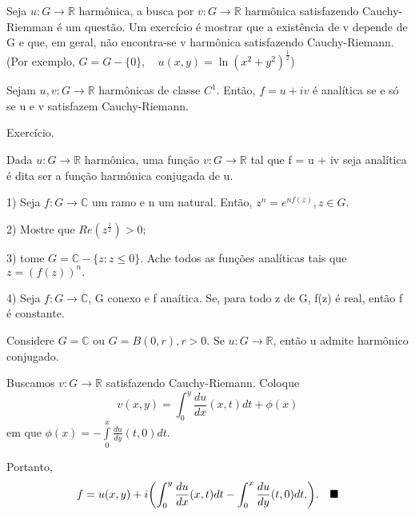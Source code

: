 \documentclass[ComplexAnalysis/complex.tex]{subfiles}
\begin{document}
Seja $u:G\rightarrow \mathbb{R}$ harm\^onica, a busca por $v:G\rightarrow \mathbb{R}$ harm\^onica
satisfazendo Cauchy-Riemman é um questão. Um exercício é mostrar que a existência de v
depende de G e que, em geral, não encontra-se v harm\^onica satisfazendo Cauchy-Riemann.
(Por exemplo, $G = G - \{0\}, \quad u(x, y) = \ln{(x ^{2} + y ^{2})}^{\frac{1}{2}}$)
\begin{theorem*}
	Sejam $u, v:G\rightarrow \mathbb{R}$ harm\^onicas de classe $C^1$. Então, $f = u + iv$
	é analítica se e só se u e v satisfazem Cauchy-Riemann.
\end{theorem*}
\begin{proof*}
	Exercício.
\end{proof*}
Dada $u:G\rightarrow \mathbb{R}$ harm\^onica, uma função $v:G\rightarrow \mathbb{R}$
tal que f = u + iv seja analítica é dita ser a função harm\^onica conjugada de u.
\begin{exer*}
	\item[1)] Seja $f:G\rightarrow \mathbb{C}$  um ramo e n um natural. Então, $z ^{n} = e ^{nf(z)}, z\in{G}.$
	\item[2)] Mostre que $Re(z ^{\frac{1}{2}}) > 0;$
	\item[3)] tome $G = \mathbb{C} - \{z: z\leq{0}\}.$ Ache todos as funções analíticas
	tais que $z = (f(z))^{n}.$
	\item[4)] Seja $f:G\rightarrow \mathbb{C}$, G conexo e f anaítica. Se, para todo
	z de G, f(z) é real, então f é constante.
\end{exer*}
\begin{theorem*}
	Considere $G = \mathbb{C} \text{ ou } G = B(0, r), r > 0.$ Se $u:G\rightarrow \mathbb{R}$,
	então u admite harm\^onico conjugado.
\end{theorem*}
\begin{proof*}
	Buscamos $v:G\rightarrow \mathbb{R}$ satisfazendo Cauchy-Riemann. Coloque
	$$
		v(x, y) = \int_{0}^{y}\frac{du}{dx}(x, t)dt + \phi(x)
	$$
	em que $\phi(x) = -\int\limits_{0}^{x}\frac{du}{dy}(t, 0)dt.$

	Portanto,
	$$
		f = u(x, y) + i\biggl(\int_{0}^{y}\frac{du}{dx}(x, t)dt - \int_{0}^{x}\frac{du}{dy}(t, 0)dt.\biggr).\quad\text{$\blacksquare$}
	$$
\end{proof*}
\end{document}
